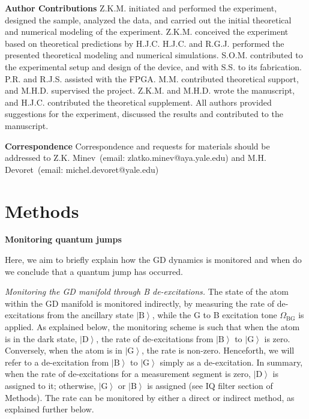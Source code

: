 \documentclass[
	 			preprint,     		superscriptaddress, 																longbibliography,
		amsmath, amssymb,
		aps,  prb,   		floatfix,
		linenumbers     
	]{revtex4-1}
\newcommand{\ket}[1]{\left|#1\right>}
\begin{document}
\textbf{Author Contributions}\enspace
Z.K.M. initiated and performed the experiment, designed the sample, analyzed the data, and carried out the initial theoretical and numerical modeling of the experiment. 
Z.K.M. conceived the experiment based on theoretical predictions by H.J.C.
H.J.C. and R.G.J. performed the presented theoretical modeling and numerical simulations.
S.O.M. contributed to the experimental setup and design of the device, and with S.S. to its fabrication.
P.R. and R.J.S. assisted with the FPGA.  
M.M. contributed theoretical support, and M.H.D. supervised the project.
Z.K.M. and M.H.D. wrote the manuscript, and H.J.C. contributed the theoretical supplement. 
All authors provided suggestions for the experiment, discussed the results and contributed to the manuscript.

\textbf{Correspondence}\enspace 
Correspondence and requests for materials should be addressed to Z.K. Minev~(email: zlatko.minev@aya.yale.edu) and M.H. Devoret~(email: michel.devoret@yale.edu)

\normalsize


\ifUSEMULTIBIB
	\nocite{apsrev41Control}
	
	
\fi






\clearpage
\normalsize

\onecolumngrid
\section*{Methods}
\twocolumngrid

\makeatletter
\renewcommand{\fnum@figure}{\textbf{Extended Data Figure~\thefigure}}
\renewcommand{\fnum@table}{\textbf{Extended Data Table~\thetable}}
\makeatother


\setcounter{figure}{0}
\setcounter{table}{0}




\textbf{Monitoring quantum jumps}
\label{sec:What_Are_Quantum_Jumps}


Here, we aim to briefly explain  how  the GD dynamics is monitored and when do we conclude that a quantum jump has occurred.


\textit{Monitoring the GD manifold through B de-excitations.}
The state of the atom within the GD manifold is monitored indirectly, by measuring the rate of de-excitations from the ancillary state $\ket{\mathrm{B}}$, while the G to B excitation tone $\Omega_\mathrm{BG}$ is applied.
As explained below, the monitoring scheme is such that when the atom is in the dark state, $\ket{\mathrm{D}}$, the rate of de-excitations from $\ket{\mathrm{B}}$ to $\ket{\mathrm{G}} $ is zero.
Conversely, when the atom is in  $\ket{\mathrm{G}}$, the rate  is non-zero.
Henceforth, we will  refer to a de-excitation from $\ket{\mathrm{B}}$ to $\ket{\mathrm{G}}$  simply as a de-excitation.
In summary,  when the rate of de-excitations for a measurement segment is zero, $\ket{\mathrm{D}}$ is assigned to it; otherwise, $\ket{\mathrm{G}}$ or $\ket{\mathrm{B}}$ is assigned (see IQ filter section of Methods).
The rate can be monitored by either a direct or indirect method, as explained further below.  
\end{document}
